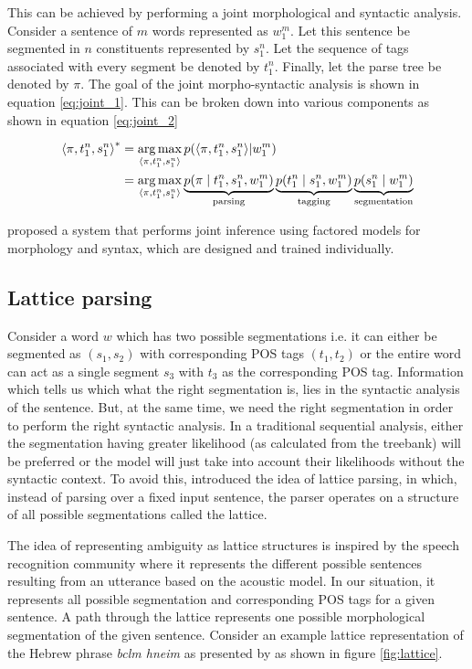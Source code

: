 This can be achieved by performing a joint morphological and syntactic analysis. Consider a sentence of $m$ words represented as  $w_1^m$. Let this sentence be segmented in $n$ constituents represented by $s_1^n$. Let the sequence of tags associated with every segment be denoted by $t_1^n$. Finally, let the parse tree be denoted by $\pi$. The goal of the joint morpho-syntactic analysis is shown in equation \ref{eq:joint_1}. This can be broken down into various components as shown in equation \ref{eq:joint_2}

\begin{align}
    \label{eq:joint_1}
    {\langle \pi, t_1^n, s_1^n \rangle}^* &= \operatorname*{arg\,max}_{\langle \pi, t_1^n, s_1^n \rangle} p({\langle \pi, t_1^n, s_1^n \rangle} | w_1^m) \\
    &= \operatorname*{arg\,max}_{\langle \pi, t_1^n, s_1^n \rangle} \underbrace{p(\pi \mid t_1^n, s_1^n, w_1^m)}_\text{parsing} \underbrace{p(t_1^n \mid s_1^n, w_1^m)}_\text{tagging} \underbrace{p(s_1^n \mid w_1^m)}_\text{segmentation}
    \label{eq:joint_2}
\end{align}

\cite{cohen:smith:2007} proposed a system that performs joint inference using factored models for morphology and syntax, which are designed and trained individually.


\subsection{Lattice parsing}
\label{sec:lattice}

Consider a word $w$ which has two possible segmentations i.e. it can either be segmented as $(s_1, s_2)$ with corresponding POS tags $(t_1, t_2)$ or the entire word can act as a single segment $s_3$ with $t_3$ as the corresponding POS tag. Information which tells us which what the right segmentation is, lies in the syntactic analysis of the sentence. But, at the same time, we need the right segmentation in order to perform the right syntactic analysis. In a traditional sequential analysis, either the segmentation having greater likelihood (as calculated from the treebank) will be preferred or the model will just take into account their likelihoods without the syntactic context. To avoid this, \cite{goldberg:tsarfaty:2008} introduced the idea of lattice parsing, in which, instead of parsing over a fixed input sentence, the parser operates on a structure of all possible segmentations called the lattice.

The idea of representing ambiguity as lattice structures is inspired by the speech recognition community \cite{chappelier:etal:1999} where it represents the different possible sentences resulting from an utterance based on the acoustic model. In our situation, it represents all possible segmentation and corresponding POS tags for a given sentence. A path through the lattice represents one possible morphological segmentation of the given sentence. Consider an example lattice representation of the Hebrew phrase \textit{bclm hneim} as presented by \cite{goldberg:tsarfaty:2008} as shown in figure \ref{fig:lattice}.


